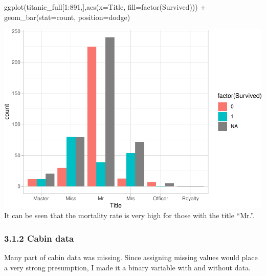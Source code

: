 \documentclass[
]{article}
\newenvironment{Shaded}{\begin{snugshade}}{\end{snugshade}}
\newcommand{\AttributeTok}[1]{\textcolor[rgb]{0.77,0.63,0.00}{#1}}
\newcommand{\DecValTok}[1]{\textcolor[rgb]{0.00,0.00,0.81}{#1}}
\newcommand{\FunctionTok}[1]{\textcolor[rgb]{0.00,0.00,0.00}{#1}}
\newcommand{\NormalTok}[1]{#1}
\newcommand{\OtherTok}[1]{\textcolor[rgb]{0.56,0.35,0.01}{#1}}
\newcommand{\SpecialCharTok}[1]{\textcolor[rgb]{0.00,0.00,0.00}{#1}}
\newcommand{\StringTok}[1]{\textcolor[rgb]{0.31,0.60,0.02}{#1}}
\begin{document}
\begin{Shaded}
\begin{Highlighting}[]
\FunctionTok{ggplot}\NormalTok{(titanic\_full[}\DecValTok{1}\SpecialCharTok{:}\DecValTok{891}\NormalTok{,],}\FunctionTok{aes}\NormalTok{(}\AttributeTok{x=}\NormalTok{Title, }\AttributeTok{fill=}\FunctionTok{factor}\NormalTok{(Survived))) }\SpecialCharTok{+}
  \FunctionTok{geom\_bar}\NormalTok{(}\AttributeTok{stat=}\StringTok{\textquotesingle{}count\textquotesingle{}}\NormalTok{, }\AttributeTok{position=}\StringTok{\textquotesingle{}dodge\textquotesingle{}}\NormalTok{) }
\end{Highlighting}
\end{Shaded}

\includegraphics{final_pdf_files/figure-latex/unnamed-chunk-27-1.pdf} It
can be seen that the mortality rate is very high for those with the
title ``Mr.''.

\hypertarget{cabin-data}{%
\subsubsection{\texorpdfstring{\textbf{3.1.2 Cabin
data}}{3.1.2 Cabin data}}\label{cabin-data}}

Many part of cabin data was missing. Since assigning missing values
would place a very strong presumption, I made it a binary variable with
and without data.

\begin{Shaded}
\end{Shaded}
\end{document}
